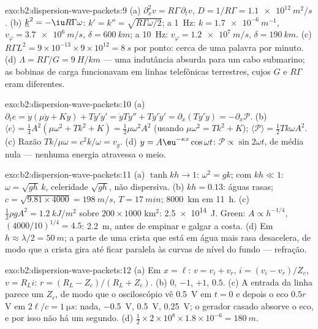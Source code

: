\begin{solution}{exo:b2:dispersion-wave-packets:9}
(a) $\partial_x^2v = R\Gamma\,\partial_tv$, $D = 1/R\Gamma = \qty{1.1e12}{m^2/s}$. (b) $\underline k^2
= -\iu R\Gamma\omega$: $k' = k'' = \sqrt{R\Gamma\omega/2}$; a \qty{1}{Hz}: $k = \qty{1.7e-6}{m^{-1}}$,
$v_\varphi = \qty{3.7e6}{m/s}$, $\delta = \qty{600}{km}$; a \qty{10}{Hz}: $v_\varphi = \qty{1.2e7}{m/s}$,
$\delta = \qty{190}{km}$. (c) $R\Gamma L^2 = 9 \times 10^{-13} \times 9 \times 10^{12} = \qty{8}{s}$
por ponto: cerca de uma palavra por minuto. (d) $\Lambda = R\Gamma/G = \qty{9}{H/km}$ --- uma
indutância absurda para um cabo submarino; as bobinas de carga funcionavam em linhas
telefônicas terrestres, cujos $G$ e $R\Gamma$ eram diferentes.
\end{solution}

\begin{solution}{exo:b2:dispersion-wave-packets:10}
(a) $\partial_te = \dot y(\mu\ddot y + Ky) + Ty'\dot y' = \dot yTy'' + Ty'\dot y' = \partial_x
(Ty'\dot y) = -\partial_x\mathcal P$. (b) $\langle e\rangle = \tfrac14A^2(\mu\omega^2 + Tk^2 + K) =
\tfrac12\mu\omega^2A^2$ (usando $\mu\omega^2 = Tk^2 + K$); $\langle\mathcal P\rangle = \tfrac12Tk\omega
A^2$. (c) Razão $Tk/\mu\omega = c^2k/\omega = v_g$. (d) $y = A\eu^{-\kappa x}\cos\omega t$:
$\mathcal P \propto \sin2\omega t$, de média nula --- nenhuma energia atravessa o meio.
\end{solution}

\begin{solution}{exo:b2:dispersion-wave-packets:11}
(a) $\tanh kh \to 1$: $\omega^2 = gk$; com $kh \ll 1$: $\omega = \sqrt{gh}\,k$, celeridade $\sqrt{gh}$,
não dispersiva. (b) $kh = 0.13$: águas rasas; $c = \sqrt{9.81 \times 4000} = \qty{198}{m/s}$,
$T = \qty{17}{min}$; \qty{8000}{km} em \qty{11}{h}. (c) $\tfrac12\rho gA^2 = \qty{1.2}{kJ/m^2}$
sobre $200 \times 1000$ km$^2$: \qty{2.5e14}{J}. Green: $A \propto h^{-1/4}$, $(4000/10)^{1/4}
= 4.5$: \qty{2.2}{m}, antes de empinar e galgar a costa. (d) Em $h \approx \lambda/2 =
\qty{50}{m}$; a parte de uma crista que está em água mais rasa desacelera, de modo que a
crista gira até ficar paralela às curvas de nível do fundo --- refração.
\end{solution}

\begin{solution}{exo:b2:dispersion-wave-packets:12}
(a) Em $x = \ell$: $v = v_i + v_r$, $i = (v_i - v_r)/Z_c$, $v = R_Li$: $r = (R_L -
Z_c)/(R_L + Z_c)$. (b) $0$, $-1$, $+1$, $0.5$. (c) A entrada da linha parece um
$Z_c$, de modo que o osciloscópio vê \qty{0.5}{V} em $t = 0$ e depois o eco $0.5r$ V em
$2\ell/c = \qty{1}{\micro s}$: nada, \qty{-0.5}{V}, \qty{+0.5}{V}, \qty{+0.25}{V}; o
gerador casado absorve o eco, e por isso não há um segundo. (d)
$\tfrac12 \times 2 \times 10^8 \times 1.8 \times 10^{-6} = \qty{180}{m}$.
\end{solution}

